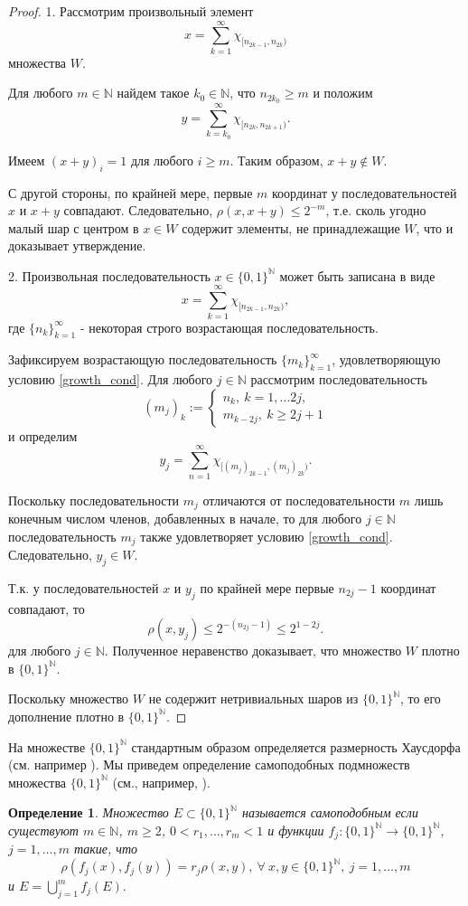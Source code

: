 \documentclass[12pt]{article}
\newtheorem{dfn}[thm]{Определение}
\def\N{{\mathbb{N}}}
\begin{document}
\begin{proof}
1. Рассмотрим произвольный элемент
$$x=\sum_{k=1}^\infty \chi_{[n_{2k-1},n_{2k})}$$
множества $W$.

Для любого $m\in \N$ найдем такое $k_0\in\N$, что $n_{2k_0}\ge m$ и положим
$$y=\sum_{k=k_0}^\infty \chi_{[n_{2k},n_{2k+1})}.$$

Имеем $(x+y)_i=1$ для любого $i\ge m$. Таким образом, $x+y\notin W$.

С другой стороны, по крайней мере, первые $m$ координат у последовательностей $x$ и $x+y$ совпадают. Следовательно, $\rho(x,x+y)\le2^{-m}$, т.е. сколь угодно малый шар с центром в $x\in W$ содержит элементы, не принадлежащие $W$, что и доказывает утверждение.

2. Произвольная последовательность $x\in\{0,1\}^\N$ может быть записана в виде
$$x=\sum_{k=1}^\infty \chi_{[n_{2k-1},n_{2k})},$$
где $\{n_k\}_{k=1}^\infty$ - некоторая строго возрастающая последовательность.

Зафиксируем возрастающую последовательность $\{m_k\}_{k=1}^\infty$, удовлетворяющую условию \eqref{growth_cond}. Для любого $j\in \N$ рассмотрим последовательность
$$(m_j)_k:=
\begin{cases}
n_k, \ k=1,\dots 2j,\\
m_{k-2j}, \ k\ge 2j+1
\end{cases}$$
и определим
$$y_j=\sum_{n=1}^\infty \chi_{[(m_j)_{2k-1},(m_j)_{2k})}.$$

Поскольку последовательности $m_j$ отличаются от последовательности $m$ лишь конечным числом членов, добавленных в начале, то для любого $j\in \N$ последовательность $m_j$ также удовлетворяет условию \eqref{growth_cond}. Следовательно, $y_j\in W$.

Т.к. у последовательностей $x$ и $y_j$ по крайней мере первые $n_{2j}-1$ координат совпадают, то
$$\rho(x,y_j)\le2^{-(n_{2j}-1)}\le2^{1-2j}.$$
для любого $j\in \N$. Полученное неравенство доказывает, что множество $W$ плотно в $\{0,1\}^\N$.


Поскольку множество $W$ не содержит нетривиальных шаров из $\{0,1\}^\N$, то его дополнение плотно в $\{0,1\}^\N$.
\end{proof}

На множестве $\{0,1\}^\N$ стандартным образом определяется размерность Хаусдорфа (см. например \cite[Секция 6]{Edgar}). Мы приведем определение самоподобных подмножеств множества $\{0,1\}^\N$ (см., например, \cite{falconer}).

\begin{dfn}
Множество $E\subset\{0,1\}^\N$ называется самоподобным если существуют $m\in\N$, $m\ge2$, $0< r_1, \dots, r_m<1$ и функции $f_j : \{0,1\}^\N \to \{0,1\}^\N$, $j=1,\dots, m$ такие, что 
$$\rho(f_j(x), f_j(y)) = r_j \rho(x,y), \ \forall \ x,y \in \{0,1\}^\N, \ j=1,\dots, m$$
и $E=\bigcup_{j=1}^m f_j(E).$
\end{dfn}
\end{document}
